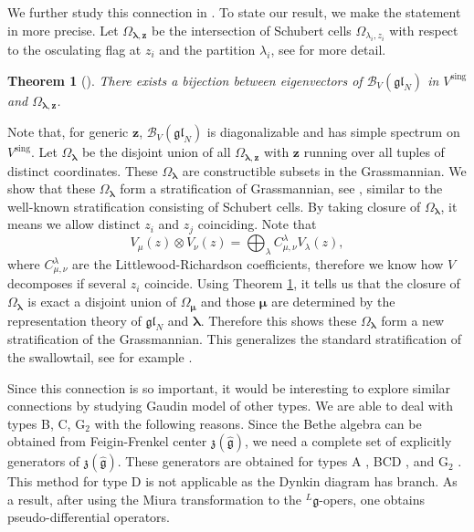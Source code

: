 \documentclass[11pt,reqno]{amsart}
\numberwithin{equation}{section}
\newtheorem{thm}{Theorem}[section]
\theoremstyle{definition}
\theoremstyle{remark}
\newcommand{\mc}{\mathcal}
\newcommand{\gl}{\mathfrak{gl}}
\newcommand{\g}{\mathfrak{g}}
\newcommand{\sing}{{\mathrm{sing}}}
\newcommand{\la}{\lambda}
\newcommand{\bla}{\bm\lambda}
\newcommand{\zg}{\mathfrak{z}(\widehat{\g})}
\begin{document}
We further study this connection in \cite{LMV:2018}. To state our result, we make the statement in \cite{MTV:2009b} more precise. Let $\Omega_{\bla,\bm z}$ be the intersection of Schubert cells $\Omega_{\la_i,z_i}$ with respect to the osculating flag at $z_i$ and the partition $\la_i$, see \cite[Section 3.1]{LMV:2018} for more detail.
\begin{thm}[\cite{MTV:2009b}]\label{thm mtv09}
There exists a bijection between eigenvectors of $\mc B_V(\gl_N)$ in $V^\sing$ and $\Omega_{\bla,\bm z}$. 
\end{thm}
Note that, for generic $\bm z$, $\mc B_V(\gl_N)$ is diagonalizable and has simple spectrum on $V^\sing$. Let $\Omega_{\bla}$ be the disjoint union of all $\Omega_{\bla,\bm z}$ with $\bm z$ running over all tuples of distinct coordinates. These $\Omega_{\bla}$ are constructible subsets in the Grassmannian. We show that these $\Omega_{\bla}$ form a stratification of Grassmannian, see \cite[Section 3.3]{LMV:2018}, similar to the well-known stratification consisting of Schubert cells. By taking closure of $\Omega_{\bla}$, it means we allow distinct $z_i$ and $z_j$ coinciding. Note that
$$V_{\mu}(z)\otimes V_{\nu}(z)= \bigoplus_{\la} C_{\mu,\nu}^{\la}V_{\la}(z),$$ where $C_{\mu,\nu}^{\la}$ are the Littlewood-Richardson coefficients, therefore we know how $V$ decomposes if several $z_i$ coincide. Using Theorem \ref{thm mtv09}, it tells us that the closure of $\Omega_{\bla}$ is exact a disjoint union of $\Omega_{\bm \mu}$ and those $\bm \mu$ are determined by the representation theory of $\gl_N$ and $\bla$. Therefore this shows these $\Omega_{\bla}$ form a new stratification of the Grassmannian. This generalizes the standard
stratification of the swallowtail, see for example  \cite[Section 2.5 of Part 1]{AGV:1985}.

Since this connection is so important, it would be interesting to explore similar connections by studying Gaudin model of other types. We are able to deal with types B, C, G$_2$ with the following reasons. Since the Bethe algebra can be obtained from Feigin-Frenkel center $\zg$, we need a complete set of explicitly generators of $\zg$. These generators are obtained for types A \cite{CT:2006}, BCD \cite{M}, and G$_2$ \cite{MRR:2016}. This method for type D is not applicable as the Dynkin diagram has branch. As a result, after using the Miura transformation to the $^L\g$-opers, one obtains pseudo-differential operators.
\end{document}
